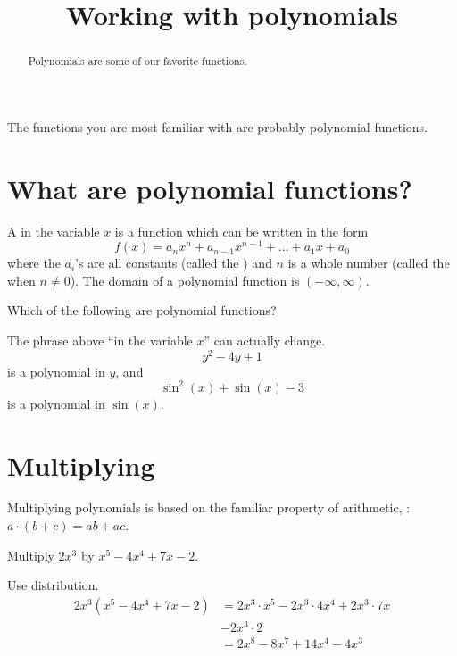\documentclass{ximera}
\title[Dig-In:]{Working with polynomials}
\begin{document}
\begin{abstract}
  Polynomials are some of our favorite functions. 
\end{abstract}
\maketitle


The functions you are most familiar with are probably polynomial
functions.

\section{What are polynomial functions?}

\begin{definition}
  A  in the variable $x$ is a function
  which can be written in the form
  \[
  f(x) = a_nx^n + a_{n-1}x^{n-1} + \dots + a_1 x + a_0
  \]
  where the $a_i$'s are all constants (called the )
  and $n$ is a whole number (called the  when $n\ne
  0$). The domain of a polynomial function is $(-\infty,\infty)$.
\end{definition}

\begin{question}
	Which of the following are polynomial functions?
	\begin{selectAll}
	\end{selectAll}
\end{question}

The phrase above ``in the variable $x$'' can actually change.
\[
y^2-4y +1
\]
is a polynomial in $y$, and
\[
\sin^2(x) + \sin(x) -3 
\]
is a polynomial in $\sin(x)$.


\section{Multiplying}

Multiplying polynomials is based on the familiar property of arithmetic, : $\displaystyle a\cdot( b + c ) = ab + ac$.
\begin{example}
	Multiply $2x^3$ by $x^5 - 4x^4 + 7x - 2$.
	\begin{explanation}
		Use distribution.
		\begin{align*}
			2x^3 \left( x^5 - 4x^4 + 7x - 2 \right) &= 2x^3 \cdot x^5 - 2x^3 \cdot 4x^4 + 2x^3 \cdot 7x \\
				& - 2x^3 \cdot 2\\
				&= 2 x^8 - 8x^7 + 14x^4 - 4x^3
		\end{align*}
	\end{explanation}
\end{example}
\end{document}
